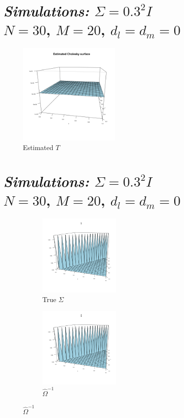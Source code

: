 \documentclass[12pt]{article}
\theoremstyle{definition}
\begin{document}


 
\section{\emph{Simulations: }$\Sigma = 0.3^2 I$\\
$N = 30$, $M=20$, $d_l = d_m= 0$}


    \begin{center}
    \begin{figure}[H]
    \graphicspath{{img/}}
 \includegraphics[width=5cm]{identity-cov-estimated-cholesky}
 \caption{Estimated $T$ }
 \end{figure}
     \end{center}
  

 


 
\section{\emph{Simulations: }$\Sigma = 0.3^2 I$\\
$N = 30$, $M=20$, $d_l = d_m= 0$}

\begin{center}
\begin{figure}[H] \label{row-col-differencing}
 \begin{subfigure}{.48\textwidth}
 \includegraphics[width=4cm]{img/identity-cov-true-covariance}
 \caption{True $\Sigma$ }
 \end{subfigure}
 \begin{subfigure}{.48\textwidth}
  \includegraphics[width=4cm]{img/identity-cov-estimated-covariance}
 \caption{$\hat{\Omega}^{-1}$}
 \end{subfigure}
 \end{figure}
     \end{center}
\end{document}
